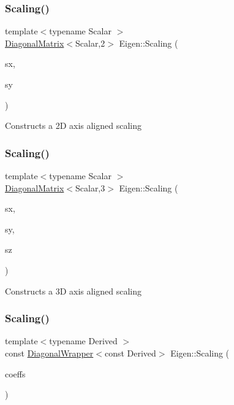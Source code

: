\subsubsection{\texorpdfstring{Scaling()}{Scaling()}\hspace{0.1cm}{\footnotesize\ttfamily [4/6]}}
{\footnotesize\ttfamily template$<$typename Scalar $>$ \\
\mbox{\hyperlink{class_eigen_1_1_diagonal_matrix}{Diagonal\+Matrix}}$<$Scalar,2$>$ Eigen\+::\+Scaling (\begin{DoxyParamCaption}\item[{const Scalar \&}]{sx,  }\item[{const Scalar \&}]{sy }\end{DoxyParamCaption})\hspace{0.3cm}{\ttfamily [inline]}}

Constructs a 2D axis aligned scaling \mbox{\label{group___geometry___module_ga162d759175d7c5214f33fefb30862815}} 
\subsubsection{\texorpdfstring{Scaling()}{Scaling()}\hspace{0.1cm}{\footnotesize\ttfamily [5/6]}}
{\footnotesize\ttfamily template$<$typename Scalar $>$ \\
\mbox{\hyperlink{class_eigen_1_1_diagonal_matrix}{Diagonal\+Matrix}}$<$Scalar,3$>$ Eigen\+::\+Scaling (\begin{DoxyParamCaption}\item[{const Scalar \&}]{sx,  }\item[{const Scalar \&}]{sy,  }\item[{const Scalar \&}]{sz }\end{DoxyParamCaption})\hspace{0.3cm}{\ttfamily [inline]}}

Constructs a 3D axis aligned scaling \mbox{\label{group___geometry___module_ga109425bca2048c3df19249c04e73715c}} 
\subsubsection{\texorpdfstring{Scaling()}{Scaling()}\hspace{0.1cm}{\footnotesize\ttfamily [6/6]}}
{\footnotesize\ttfamily template$<$typename Derived $>$ \\
const \mbox{\hyperlink{class_eigen_1_1_diagonal_wrapper}{Diagonal\+Wrapper}}$<$const Derived$>$ Eigen\+::\+Scaling (\begin{DoxyParamCaption}\item[{const \mbox{\hyperlink{class_eigen_1_1_matrix_base}{Matrix\+Base}}$<$ Derived $>$ \&}]{coeffs }\end{DoxyParamCaption})\hspace{0.3cm}{\ttfamily [inline]}}

